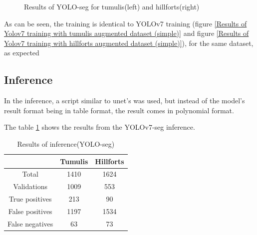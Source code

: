 \begin{figure}[H]
    \centering
    \qquad
    \caption{Results of YOLO-seg for tumulis(left) and hillforts(right)}%
\end{figure}

As can be seen, the training is identical to YOLOv7 training (figure \ref{Results of Yolov7 training with tumulis augmented dataset (simple)} and figure \ref{Results of Yolov7 training with hillforts augmented dataset (simple)}), for the same dataset, as expected

\subsection{Inference}
In the inference, a script similar to unet's was used, but instead of the model's result format being in table format, the result comes in polynomial format.

The table \ref{Results of inference(YOLO-seg)} shows the results from the YOLOv7-seg inference.

\begin{table}[H]
\centering
\begin{tabular}{|c c c|} 
 \hline
  &  Tumulis & Hillforts \\ [0.5ex] 
 \hline\hline
 Total & 1410 & 1624 \\ 
 Validations & 1009 & 553 \\
 True positives & 213 & 90 \\
 False positives & 1197 & 1534 \\
 False negatives & 63 & 73\\ [1ex] 
 \hline
\end{tabular}
\caption{Results of inference(YOLO-seg)}
\label{Results of inference(YOLO-seg)}
\end{table}

